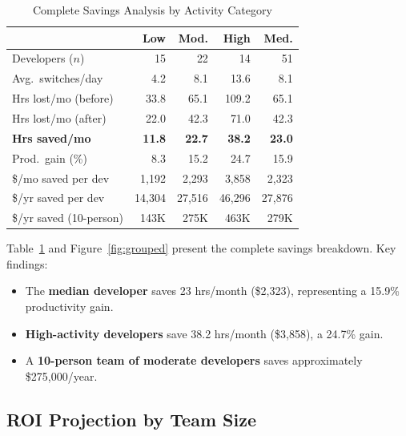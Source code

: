 \documentclass[11pt, twocolumn]{article}
\begin{document}
\begin{table}[t]
\centering
\caption{Complete Savings Analysis by Activity Category}
\label{tab:full_savings}
\begin{tabular}{@{}lrrrr@{}}
\toprule
& \textbf{Low} & \textbf{Mod.} & \textbf{High} & \textbf{Med.} \\
\midrule
Developers ($n$)           & 15   & 22   & 14   & 51 \\
Avg.\ switches/day         & 4.2  & 8.1  & 13.6 & 8.1 \\
Hrs lost/mo (before)       & 33.8 & 65.1 & 109.2 & 65.1 \\
Hrs lost/mo (after)        & 22.0 & 42.3 & 71.0 & 42.3 \\
\textbf{Hrs saved/mo}      & \textbf{11.8} & \textbf{22.7} & \textbf{38.2} & \textbf{23.0} \\
Prod.\ gain (\%)           & 8.3  & 15.2 & 24.7 & 15.9 \\
\$/mo saved per dev        & 1,192 & 2,293 & 3,858 & 2,323 \\
\$/yr saved per dev        & 14,304 & 27,516 & 46,296 & 27,876 \\
\$/yr saved (10-person)    & 143K & 275K & 463K & 279K \\
\bottomrule
\end{tabular}
\end{table}

Table~\ref{tab:full_savings} and Figure~\ref{fig:grouped} present the complete savings breakdown. Key findings:

\begin{itemize}[noitemsep, topsep=2pt]
    \item The \textbf{median developer} saves 23 hrs/month (\$2,323), representing a 15.9\% productivity gain.
    \item \textbf{High-activity developers} save 38.2 hrs/month (\$3,858), a 24.7\% gain.
    \item A \textbf{10-person team of moderate developers} saves approximately \$275,000/year.
\end{itemize}

\subsection{ROI Projection by Team Size}
\end{document}
